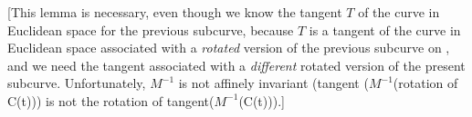 \documentclass[12pt]{article}
\begin{document}

[This lemma is necessary, even though we know the tangent $T$ of the curve
in Euclidean space for the previous subcurve, because $T$ is a tangent of
the curve in Euclidean space associated with a {\em rotated} version
of the previous subcurve on , and we need the tangent associated
with a {\em different} rotated version of the present subcurve.
Unfortunately, $M^{-1}$ is not affinely invariant 
(tangent ($M^{-1}$(rotation of C(t))) is not the rotation of 
tangent($M^{-1}$(C(t))).]
\end{document}
